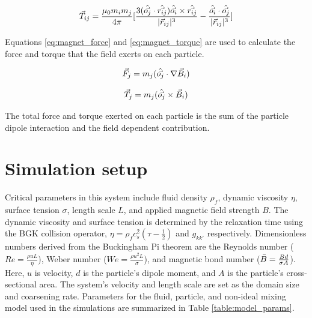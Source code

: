 \begin{equation}
    \vec{T}_{ij} = \frac{\mu_0 m_i m_j}{4 \pi}[ \frac{3(\Hat{\vec{o_j}} \cdot \Hat{\vec{r_{ij}}})\Hat{\vec{o_i}} \times \Hat{\vec{r_{ij}}} }
    {|\vec{r}_{ij}|^3} - \frac{\Hat{\vec{o_i}} \cdot \Hat{\vec{o_j}} }{|\vec{r}_{ij}|^3} ]
    \label{eq:dipole_magnetic_torque}
\end{equation}

Equations \ref{eq:magnet_force} and \ref{eq:magnet_torque} are used to calculate the force and torque that the 
field exerts on each particle.

\begin{equation}
    \vec{F}_{j} = m_j(\Hat{\vec{o_j}} \cdot \nabla \vec{B}_{i})
    \label{eq:magnet_force}
\end{equation}

\begin{equation}
    \vec{T}_{j} = m_j(\Hat{\vec{o_j}} \times \vec{B}_{i})
    \label{eq:magnet_torque}
\end{equation}

The total force and torque exerted on each particle is the sum of the particle dipole interaction and the field 
dependent contribution. 

\section{Simulation setup}
\label{section:sim_setup}

Critical parameters in this system include fluid density $\rho_f$, dynamic viscosity $\eta$, surface tension $\sigma$, 
length scale $L$, and applied magnetic field strength $B$. The dynamic viscosity and surface tension is determined 
by the relaxation time using the BGK collision operator, $\eta = \rho_f c_s^2(\tau - \frac{1}{2})$ and $g_{kk'}$ 
respectively. Dimensionless numbers derived from the Buckingham Pi theorem are the Reynolds number
($Re = \frac{\rho u L}{\eta}$), Weber number ($We = \frac{\rho u^2 L}{\sigma}$), and magnetic bond number 
($\Bar{B} = \frac{Bd}{\sigma A}$). Here, $u$ is velocity, $d$ is the particle's dipole moment, and $A$ is the 
particle's cross-sectional area. The system's velocity and length scale are set as the domain size and coarsening rate. 
Parameters for the fluid, particle, and non-ideal mixing model used in the simulations are summarized in Table 
\ref{table:model_params}.

